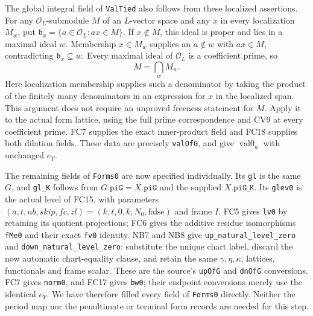 The global integral field of \texttt{ValTied} also follows from
these localized assertions. For any $\mathcal O_L$-submodule $M$
of an $L$-vector space and any $x$ in every localization $M_w$,
put $\mathfrak b_x=\{a\in\mathcal O_L:ax\in M\}$.
If $x\notin M$, this ideal is proper and lies in a maximal ideal
$w$. Membership $x\in M_w$ supplies an $a\notin w$ with
$ax\in M$, contradicting $\mathfrak b_x\subseteq w$.
Every maximal ideal of $\mathcal O_L$ is a coefficient prime, so
\[
                         M=\bigcap_w M_w.           \tag{FC.39}
\]
Here localization membership supplies such a denominator by taking
the product of the finitely many denominators in an expression for
$x$ in the localized span. This argument does not require an
unproved freeness statement for $M$.
Apply it to the actual form lattice, using the full prime correspondence
and CV9 at every coefficient prime. FC7 supplies the exact inner-product
field and FC18 supplies both dilation fields. These data are precisely
\texttt{valOfG}, and give $\operatorname{val0}_u$ with unchanged $e_Y$.

The remaining fields of \texttt{Forms0} are now specified individually.
Its \texttt{gl} is the same $G$, and \texttt{gl\_K} follows from
$G.\texttt{piG}=X.\texttt{piG}$ and the supplied
$X.\texttt{piG\_K}$. Its \texttt{glev0} is the actual level of FC15,
with parameters
$(a,t,nb,skip,fc,zl)=(k,t,0,k,N_0,\mathrm{false})$ and frame $I$.
FC5 gives \texttt{lv0} by retaining its quotient projections;
FC6 gives the additive residue isomorphisms \texttt{fMe0} and
their exact \texttt{fv0} identity. NB7 and NB8 give
\texttt{up\_natural\_level\_zero} and
\texttt{down\_natural\_level\_zero}: substitute the unique chart
label, discard the now automatic chart-equality clause, and retain
the same $\gamma,\eta,\kappa$, lattices, functionals and frame scalar.
These are the source's \texttt{upOfG} and \texttt{dnOfG} conversions.
FC7 gives \texttt{norm0}, and FC17 gives \texttt{bw0}; their endpoint
conversions merely use the identical $e_Y$. We have therefore filled
every field of \texttt{Forms0} directly. Neither the period map nor
the penultimate or terminal form records are needed for this step.

